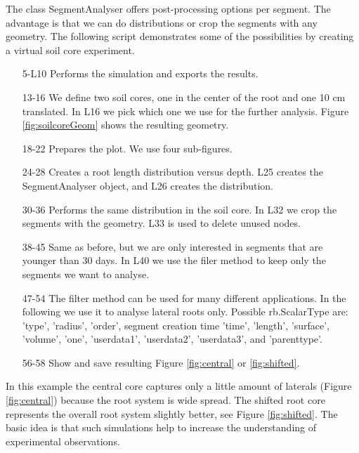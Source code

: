 \documentclass[a4paper]{article}
\begin{document}
The class SegmentAnalyser offers post-processing options per segment. 
The advantage is that we can do distributions or crop the segments with any geometry. 
The following script demonstrates some of the possibilities by creating a virtual soil core experiment. 



\begin{itemize}

\item[5-L10] Performs the simulation and exports the results.

\item[13-16] We define two soil cores, one in the center of the root and one 10 cm translated. In L16 we pick which one we use for the further analysis.  Figure \ref{fig:soilcoreGeom} shows the resulting geometry.

\item[18-22] Prepares the plot. We use four sub-figures. 

\item[24-28] Creates a root length distribution versus depth. L25 creates the SegmentAnalyser object, and L26 creates the distribution.

\item[30-36] Performs the same distribution in the soil core. In L32 we crop the segments with the geometry. L33 is used to delete unused nodes. 

\item[38-45] Same as before, but we are only interested in segments that are younger than 30 days. In L40 we use the filer method to keep only the segments we want to analyse. 

\item[47-54] The filter method can be used for many different applications. In the following we use it to analyse lateral roots only. Possible rb.ScalarType are: 
'type', 'radius', 'order', segment creation time 'time', 'length', 'surface', 'volume', 'one', 'userdata1', 'userdata2', 'userdata3', and 'parenttype'.
\item[56-58] Show and save resulting Figure \ref{fig:central} or \ref{fig:shifted}.

\end{itemize}

In this example the central core captures only a little amount of laterals (Figure \ref{fig:central}) because the root system is wide spread. 
The shifted root core represents the overall root system slightly better, see Figure \ref{fig:shifted}.  
The basic idea is that such simulations help to increase the understanding of experimental observations.
\end{document}
